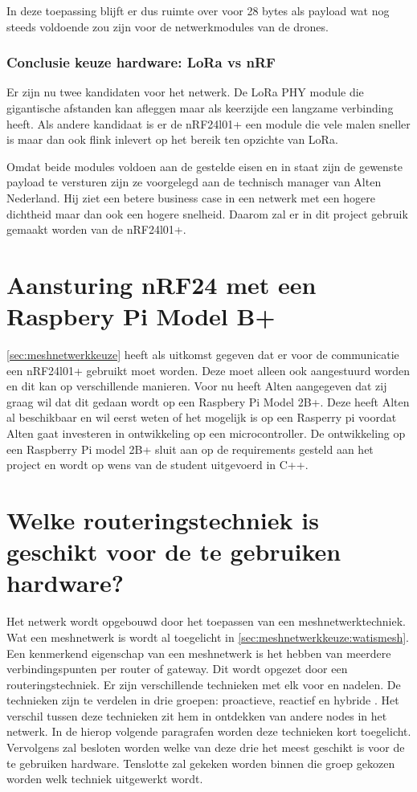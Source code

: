 \documentclass[a4paper, 11pt, oneside]{report}
\begin{document}
In deze toepassing blijft er dus ruimte over voor 28 bytes als payload wat nog steeds voldoende zou zijn voor de netwerkmodules van de drones.


\subsubsection{Conclusie keuze hardware: LoRa vs nRF}

Er zijn nu twee kandidaten voor het netwerk.
De LoRa PHY module die gigantische afstanden kan afleggen maar als keerzijde een langzame verbinding heeft.
Als andere kandidaat is er de nRF24l01+ een module die vele malen sneller is maar dan ook flink inlevert op het bereik ten opzichte van LoRa.

Omdat beide modules voldoen aan de gestelde eisen en in staat zijn de gewenste payload te versturen zijn ze voorgelegd aan de technisch manager van Alten Nederland.
Hij ziet een betere business case in een netwerk met een hogere dichtheid maar dan ook een hogere snelheid.
Daarom zal er in dit project gebruik gemaakt worden van de nRF24l01+.


\section[nRF24 met Raspbery Pi Model B+]{Aansturing nRF24 met een Raspbery Pi Model B+}

\autoref{sec:meshnetwerkkeuze} heeft als uitkomst gegeven dat er voor de communicatie een nRF24l01+ gebruikt moet worden.
Deze moet alleen ook aangestuurd worden en dit kan op verschillende manieren.
Voor nu heeft Alten aangegeven dat zij graag wil dat dit gedaan wordt op een Raspbery Pi Model 2B+.
Deze heeft Alten al beschikbaar en wil eerst weten of het mogelijk is op een Rasperry pi voordat Alten gaat investeren in ontwikkeling op een microcontroller.
De ontwikkeling op een Raspberry Pi model 2B+ sluit aan op de requirements gesteld aan het project en wordt op wens van de student uitgevoerd in C++.


\section[Welke routeringstechniek?]{Welke routeringstechniek is geschikt voor de te gebruiken hardware?}
\label{sec:meshnetwerktechniek}

Het netwerk wordt opgebouwd door het toepassen van een meshnetwerktechniek.
Wat een meshnetwerk is wordt al toegelicht in \autoref{sec:meshnetwerkkeuze:watismesh}.
Een kenmerkend eigenschap van een meshnetwerk is het hebben van meerdere verbindingspunten per router of gateway. Dit wordt opgezet door een routeringstechniek. Er zijn verschillende technieken met elk voor en nadelen. De technieken zijn te verdelen in drie groepen: proactieve, reactief en hybride \cite{meshprotocols}. Het verschil tussen deze technieken zit hem in ontdekken van andere nodes in het netwerk. In de hierop volgende paragrafen worden deze technieken kort toegelicht. Vervolgens zal besloten worden welke van deze drie het meest geschikt is voor de te gebruiken hardware. Tenslotte zal gekeken worden binnen die groep gekozen worden welk techniek uitgewerkt wordt.
\end{document}
